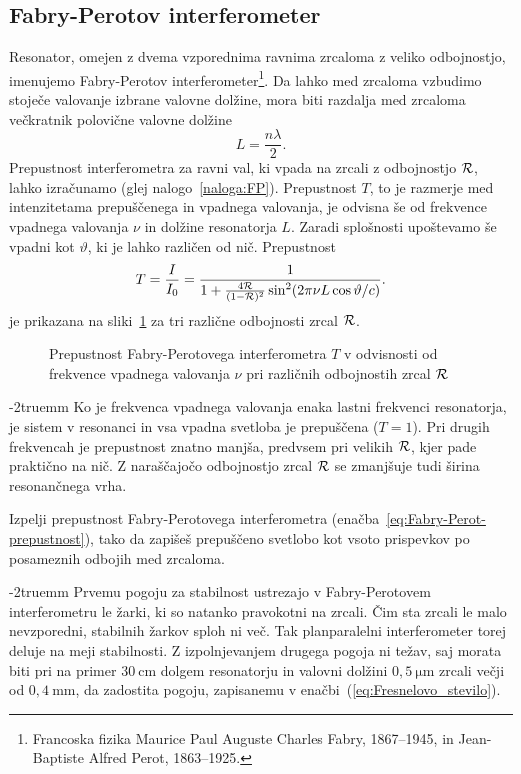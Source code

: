 \subsection*{Fabry-Perotov interferometer}
Resonator, omejen z dvema vzporednima ravnima zrcaloma
z veliko odbojnostjo, imenujemo Fabry-Perotov 
interferometer\footnote{Francoska fizika Maurice Paul Auguste Charles Fabry, 1867--1945, in 
Jean-Baptiste Alfred Perot, 1863--1925.}. 
Da lahko med zrcaloma vzbudimo stoječe valovanje izbrane valovne dolžine, mora biti razdalja 
med zrcaloma večkratnik polovične valovne dolžine
\begin{equation}
L = \frac{n \lambda}{2}.
\end{equation}
Prepustnost interferometra za ravni val, ki vpada na zrcali z
odbojnostjo ${\cal R}$, lahko izračunamo (glej nalogo~\ref{naloga:FP}). Prepustnost $T$, to je 
razmerje med intenzitetama prepuščenega in vpadnega valovanja, je odvisna še
od frekvence vpadnega valovanja $\nu$ in dolžine resonatorja $L$. Zaradi splošnosti upoštevamo
še vpadni kot $\vartheta$, ki je lahko različen od nič. Prepustnost
\begin{equation}
T=\frac{I}{I_0} = \frac{1}{1+\frac{4{\cal R}}{(1-{\cal R})^{2}}\sin^{2}(2 \pi \nu L\cos \vartheta/c)}.
\label{eq:Fabry-Perot-prepustnost}
\end{equation}
je prikazana na sliki~\ref{fig:Fabry-Perot} za tri različne odbojnosti zrcal ${\cal R}$.
\begin{figure}[ht]
\centering
\def\svgwidth{85truemm} 

\caption{
Prepustnost Fabry-Perotovega interferometra $T$
v odvisnosti od frekvence vpadnega valovanja $\nu$ pri različnih odbojnostih zrcal ${\cal R}$}
\label{fig:Fabry-Perot}
\end{figure}
\vglue-2truemm
Ko je frekvenca vpadnega valovanja enaka lastni frekvenci
resonatorja, je sistem v resonanci in vsa vpadna svetloba je prepuščena ($T=1$). 
Pri drugih frekvencah je prepustnost znatno manjša, predvsem
pri velikih $\cal{R}$, kjer pade praktično na nič. Z naraščajočo odbojnostjo zrcal ${\cal R}$ 
se zmanjšuje tudi širina resonančnega vrha.
\begin{naloga}
\label{naloga:FP}
Izpelji prepustnost Fabry-Perotovega interferometra (enačba~\ref{eq:Fabry-Perot-prepustnost}), tako da
zapišeš prepuščeno svetlobo kot vsoto prispevkov po posameznih odbojih med zrcaloma. 
\end{naloga}
\vglue-2truemm
Prvemu pogoju za stabilnost ustrezajo v Fabry-Perotovem interferometru
le žarki, ki so natanko pravokotni na zrcali. Čim sta zrcali le
malo nevzporedni, stabilnih žarkov sploh ni več. Tak 
planparalelni interferometer torej deluje 
na meji stabilnosti. Z izpolnjevanjem drugega
pogoja ni težav, saj morata biti pri na primer $30~\si{\centi\metre}$ dolgem resonatorju in 
valovni dolžini $0,5~\si{\micro\metre}$ zrcali večji od $0,4~\si{\milli\metre}$, da zadostita pogoju, 
zapisanemu v enačbi~(\ref{eq:Fresnelovo_stevilo}).

